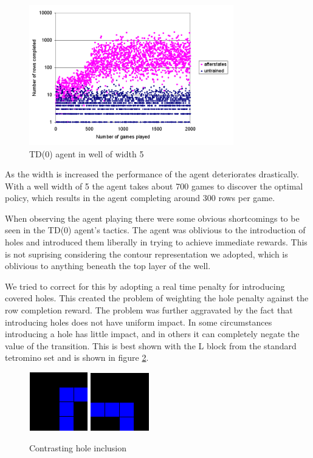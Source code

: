 \documentclass{rucsthesis}
\begin{document}
\begin{figure}[h]
\centering
\includegraphics[width=3.5in]{afterstatesredtet5well.png}
\caption{TD(0) agent in well of width 5}
\label{fig:afterstatesredtet5well}
\end{figure}

As the width is increased the performance of the agent deteriorates drastically. With a well width of 5 the agent takes about 700 games to discover the optimal policy, which results in the agent completing around 300 rows per game.

When observing the agent playing there were some obvious shortcomings to be seen in the TD(0) agent's tactics. The agent was oblivious to the introduction of holes and introduced them liberally in trying to achieve immediate rewards. This is not suprising considering the contour representation we adopted, which is oblivious to anything beneath the top layer of the well. 

We tried to correct for this by adopting a real time penalty for introducing covered holes. This created the problem of weighting the hole penalty against the row completion reward. The problem was further aggravated by the fact that introducing holes does not have uniform impact. In some circumstances introducing a hole has little impact, and in others it can completely negate the value of the transition. This is best shown with the L block from the standard tetromino set and is shown in figure \ref{fig:diffholes}. 

\begin{figure}[h]
\centering
\includegraphics[width=1in]{worthless.png}
\includegraphics[width=1in]{notworthless.png}
\caption{Contrasting hole inclusion}
\label{fig:diffholes}
\end{figure}
\end{document}

